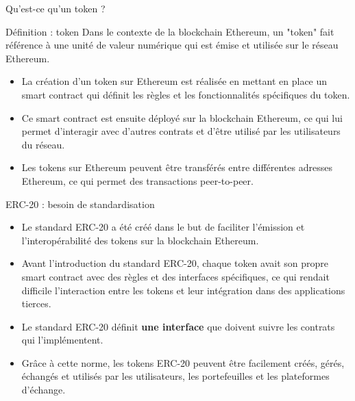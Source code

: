 
\begin{frame}{Qu'est-ce qu'un token ?}
  \begin{block}{Définition : token}
    Dans le contexte de la blockchain Ethereum, un "token" fait référence à une unité de valeur numérique qui est émise et utilisée sur le réseau Ethereum.
  \end{block}

  \begin{itemize}
    \item La création d'un token sur Ethereum est réalisée en mettant en place un smart contract qui définit les règles et les fonctionnalités spécifiques du token.
    \item Ce smart contract est ensuite déployé sur la blockchain Ethereum, ce qui lui permet d'interagir avec d'autres contrats et d'être utilisé par les utilisateurs du réseau.
    \item Les tokens sur Ethereum peuvent être transférés entre différentes adresses Ethereum, ce qui permet des transactions peer-to-peer.
  \end{itemize}
\end{frame}

\begin{frame}{ERC-20 : besoin de standardisation}
  \begin{itemize}
    \item Le standard ERC-20 a été créé dans le but de faciliter l'émission et l'interopérabilité des tokens sur la blockchain Ethereum.
    \item Avant l'introduction du standard ERC-20, chaque token avait son propre smart contract avec des règles et des interfaces spécifiques, ce qui rendait difficile l'interaction entre les tokens et leur intégration dans des applications tierces.
    \item Le standard ERC-20 définit \textbf{une interface} que doivent suivre les contrats qui l'implémentent.
    \item Grâce à cette norme, les tokens ERC-20 peuvent être facilement créés, gérés, échangés et utilisés par les utilisateurs, les portefeuilles et les plateformes d'échange.
  \end{itemize}
\end{frame}

